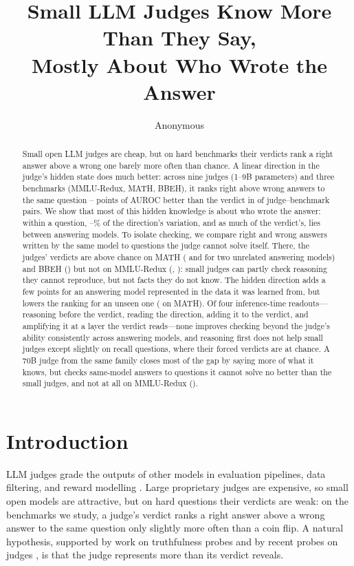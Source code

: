 \documentclass[11pt]{article}
\title{Small LLM Judges Know More Than They Say,\\Mostly About Who Wrote the Answer}
\author{Anonymous}
\begin{document}
\maketitle

\begin{abstract}
Small open LLM judges are cheap, but on hard benchmarks their verdicts rank a right answer above a wrong one barely more often than chance. A linear direction in the judge's hidden state does much better: across nine judges (1--9B parameters) and three benchmarks (MMLU-Redux, MATH, BBEH), it ranks right above wrong answers to the same question -- points of AUROC better than the verdict in  of  judge--benchmark pairs. We show that most of this hidden knowledge is about who wrote the answer: within a question, --\% of the direction's variation, and as much of the verdict's, lies between answering models. To isolate checking, we compare right and wrong answers written by the same model to questions the judge cannot solve itself. There, the judges' verdicts are above chance on MATH ( and  for two unrelated answering models) and BBEH () but not on MMLU-Redux (, ): small judges can partly check reasoning they cannot reproduce, but not facts they do not know. The hidden direction adds a few points for an answering model represented in the data it was learned from, but lowers the ranking for an unseen one ( on MATH). Of four inference-time readouts---reasoning before the verdict, reading the direction, adding it to the verdict, and amplifying it at a layer the verdict reads---none improves checking beyond the judge's ability consistently across answering models, and reasoning first does not help small judges except slightly on recall questions, where their forced verdicts are at chance. A 70B judge from the same family closes most of the gap by saying more of what it knows, but checks same-model answers to questions it cannot solve no better than the small judges, and not at all on MMLU-Redux ().
\end{abstract}

\section{Introduction}

LLM judges grade the outputs of other models in evaluation pipelines, data filtering, and reward modelling \citep{zheng2023judging}. Large proprietary judges are expensive, so small open models are attractive, but on hard questions their verdicts are weak: on the benchmarks we study, a judge's verdict ranks a right answer above a wrong answer to the same question only slightly more often than a coin flip. A natural hypothesis, supported by work on truthfulness probes \citep{azaria-mitchell-2023-internal,marks2024geometry,orgad2025llms} and by recent probes on judges \citep{radharapu-etal-2026-calibrating,gulati2026auditing}, is that the judge represents more than its verdict reveals.
\end{document}
